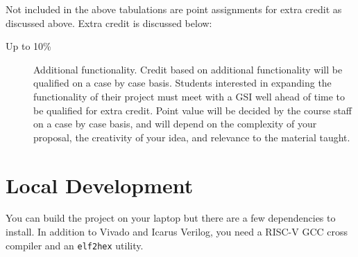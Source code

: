 \documentclass[11pt]{article}
\begin{document}
Not included in the above tabulations are point assignments for extra credit as discussed above. Extra credit is discussed below:

\begin{description}
  \item[Up to 10\%] Additional functionality. Credit based on additional functionality will be qualified on a case by case basis. Students interested in expanding the functionality of their project must meet with a GSI well ahead of time to be qualified for extra credit. Point value will be decided by the course staff on a case by case basis, and will depend on the complexity of your proposal, the creativity of your idea, and relevance to the material taught.
\end{description}

%

\newpage

\appendix
\section{Local Development}
You can build the project on your laptop but there are a few dependencies to install.
In addition to Vivado and Icarus Verilog, you need a RISC-V GCC cross compiler and an \verb|elf2hex| utility.
\end{document}
